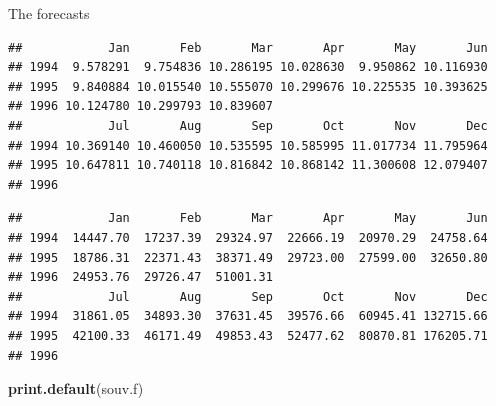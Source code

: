\documentclass[ignorenonframetext,]{beamer}
\newenvironment{Shaded}{\begin{snugshade}}{\end{snugshade}}
\newcommand{\KeywordTok}[1]{\textcolor[rgb]{0.13,0.29,0.53}{\textbf{#1}}}
\newcommand{\NormalTok}[1]{#1}
\newcommand{\OperatorTok}[1]{\textcolor[rgb]{0.81,0.36,0.00}{\textbf{#1}}}
\begin{document}
\begin{frame}[fragile]{The forecasts}
\begin{Shaded}
\end{Shaded}

\begin{verbatim}
##            Jan       Feb       Mar       Apr       May       Jun
## 1994  9.578291  9.754836 10.286195 10.028630  9.950862 10.116930
## 1995  9.840884 10.015540 10.555070 10.299676 10.225535 10.393625
## 1996 10.124780 10.299793 10.839607                              
##            Jul       Aug       Sep       Oct       Nov       Dec
## 1994 10.369140 10.460050 10.535595 10.585995 11.017734 11.795964
## 1995 10.647811 10.740118 10.816842 10.868142 11.300608 12.079407
## 1996
\end{verbatim}

\begin{Shaded}
\end{Shaded}

\begin{verbatim}
##            Jan       Feb       Mar       Apr       May       Jun
## 1994  14447.70  17237.39  29324.97  22666.19  20970.29  24758.64
## 1995  18786.31  22371.43  38371.49  29723.00  27599.00  32650.80
## 1996  24953.76  29726.47  51001.31                              
##            Jul       Aug       Sep       Oct       Nov       Dec
## 1994  31861.05  34893.30  37631.45  39576.66  60945.41 132715.66
## 1995  42100.33  46171.49  49853.43  52477.62  80870.81 176205.71
## 1996
\end{verbatim}

\begin{Shaded}
\begin{Highlighting}[]
\KeywordTok{print.default}\NormalTok{(souv.f)}
\end{Highlighting}
\end{Shaded}


\end{frame}
\end{document}
